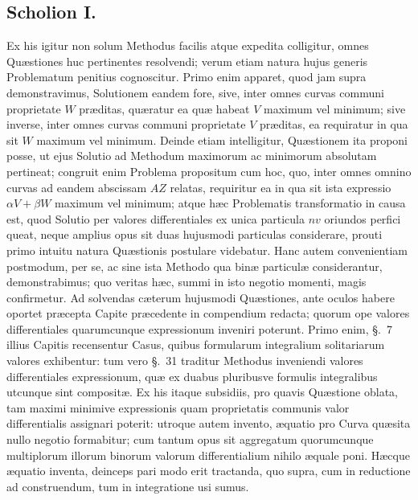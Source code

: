 \subsection*{Scholion I.}
Ex his igitur non solum Methodus facilis atque expedita colligitur, omnes Quæstiones huc pertinentes resolvendi; verum etiam natura hujus generis Problematum penitius cognoscitur. Primo enim apparet, quod jam supra demonstravimus, Solutionem eandem fore, sive, inter omnes curvas communi proprietate $W$ præditas, quæratur ea quæ habeat $V$ maximum vel minimum; sive inverse, inter omnes curvas communi proprietate $V$ præditas, ea requiratur in qua sit $W$ maximum vel minimum. Deinde etiam intelligitur, Quæstionem ita proponi posse, ut ejus Solutio ad Methodum maximorum ac minimorum absolutam pertineat; congruit enim Problema propositum cum hoc, quo, inter omnes omnino curvas ad eandem abscissam $AZ$ relatas, requiritur ea in qua sit ista expressio $\alpha V+\beta W$ maximum vel minimum; atque hæc Problematis transformatio in causa est, quod Solutio per valores differentiales ex unica particula $nv$ oriundos perfici queat, neque amplius opus sit duas hujusmodi particulas considerare, prouti primo intuitu natura Quæstionis postulare videbatur. Hanc autem convenientiam postmodum, per se, ac sine ista Methodo qua binæ particulæ considerantur, demonstrabimus; quo veritas hæc, summi in isto negotio momenti, magis confirmetur. Ad solvendas cæterum hujusmodi Quæstiones, ante oculos habere oportet præcepta Capite præcedente in compendium redacta; quorum ope valores differentiales quarumcunque expressionum inveniri poterunt. Primo enim, §.~7 illius Capitis recensentur Casus, quibus formularum integralium solitariarum valores exhibentur: tum vero §.~31 traditur Methodus inveniendi valores differentiales expressionum, quæ ex duabus pluribusve formulis integralibus utcunque sint compositæ. Ex his itaque subsidiis, pro quavis Quæstione oblata, tam maximi minimive expressionis quam proprietatis communis valor differentialis assignari poterit: utroque autem invento, æquatio pro Curva quæsita nullo negotio formabitur; cum tantum opus sit aggregatum quorumcunque multiplorum illorum binorum valorum differentialium nihilo æquale poni. Hæcque æquatio inventa, deinceps pari modo erit tractanda, quo supra, cum in reductione ad construendum, tum in integratione usi sumus.

